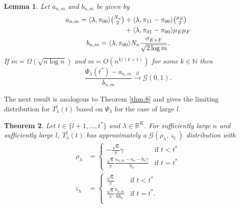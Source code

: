\documentclass[10pt,draftclsnofoot,onecolumn]{IEEEtran}
\newtheorem{theorem}{Theorem}
\newtheorem{lemma}[theorem]{Lemma}
\theoremstyle{definition}
\begin{document}
\begin{lemma}
  \label{lem:6}
  Let $a_{n,m}$ and $b_{n,m}$ be given by
  \begin{gather}
    \label{eq:28}
    \begin{split}
    a_{n,m} =%
\langle \lambda, \pi_{00} \rangle \tbinom{N_\kappa}{2} &+
\langle \lambda, \pi_{11} - \pi_{00} \rangle
\tbinom{\mu_E}{2} \\ &+ \langle \lambda, \pi_{01} - \pi_{00} \rangle \mu_E \mu_F 
    \end{split} \\
    b_{n,m} = \langle \lambda, \pi_{00} \rangle N_\kappa \frac{\sigma_{E + F}}{\sqrt{2
        \log{m}}}.
  \end{gather}
  If $m = \Omega(\sqrt{n \log n})$ and $m = O(n^{k/(k+1)})$ for some
  $k \in \mathbb{N}$ then
  \begin{equation}
    \label{eq:29}
    \frac{\Psi_{\lambda}(t^{*}) - a_{n,m}}{b_{n,m}}
    \overset{\mathrm{d}}{\longrightarrow} \mathcal{G}(0,1).
  \end{equation}
\end{lemma}
The next result is analogous to Theorem \ref{thm:8} and gives 
the limiting distribution for
$T_{\lambda}^{l}(t)$ based on $\Psi_{\lambda}$ for the case of large
$l$.
\begin{theorem}
  \label{thm:6}
  Let $t \in \{l+1, \dots, t^{*}\} $ and $\lambda \in
  \mathbb{R}^{K}$. For sufficiently large $n$ and sufficiently large
  $l$, $T_{\lambda}^{l}(t)$ has approximately a
  $\mathcal{G}(\rho_{\lambda}, \varsigma_{l})$ distribution with
  \begin{align}
    \label{eq:52}
    \rho_{\lambda} &= \begin{cases}
      - \tfrac{\sqrt{6}}{\pi} \gamma & \text{if $t < t^{*}$} \\
      \tfrac{\sqrt{6}}{\pi} \tfrac{a_{n,m} - a_n - b_n \gamma}{b_n} & \text{if
        $t = t^{*}$} 
    \end{cases} \\
      \varsigma_{\lambda} &= \begin{cases}
        \tfrac{\sqrt{6}}{\pi} & \text{if $t < t^{*}$} \\
        \tfrac{\sqrt{6}}{\pi} \tfrac{b_{n,m}}{6 b_n} & \text{if $t = t^{*}$}. \\
      \end{cases}
  \end{align}
\end{theorem}
\end{document}

